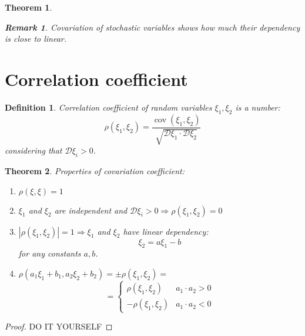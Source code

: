 \documentclass[12pt,letterpaper]{report}
\newtheorem{theorem}{Theorem}[section]
\newtheorem*{remark}{Remark}
\newtheorem{definition}{Definition}
\DeclareMathOperator{\cov}{cov}
\begin{document}
\begin{theorem}
    \begin{remark}
        Covariation of stochastic variables shows how much their dependency is close to linear.
    \end{remark}
\end{theorem}

\section{Correlation coefficient}

\begin{definition}
    Correlation coefficient of random variables $\xi_1, \xi_2$ is a number:
    \[ \rho(\xi_1, \xi_2) = \frac{\cov(\xi_1, \xi_2)}{\sqrt{\mathcal{D}\xi_1 \cdot \mathcal{D}\xi_2}} \]
    considering that $\mathcal{D}\xi_i > 0$.
\end{definition}

\begin{theorem}
    Properties of covariation coefficient:
    \begin{enumerate}
        \item $ \rho(\xi,\xi) = 1 $
        \item $\xi_1$ and $\xi_2$ are independent and $\mathcal{D}\xi_i > 0 \Rightarrow \rho (\xi_1, \xi_2) = 0$ 
        \item $ |\rho(\xi_1, \xi_2)| = 1 \Rightarrow \xi_1$ and $\xi_2$ have linear dependency:
            \[ \xi_2 = a \xi_1 - b \]
            for any constants $a, b$.
        \item $\rho (a_1\xi_1 + b_1, a_2\xi_2 + b_2) = \pm \rho(\xi_1, \xi_2) = $
            \[ = \begin{cases}
                \rho(\xi_1, \xi_2) & a_1 \cdot a_2 > 0 \\
                -\rho(\xi_1, \xi_2) & a_1\cdot a_2 < 0
            \end{cases}\]
    \end{enumerate}
\end{theorem}
\begin{proof}
    DO IT YOURSELF
\end{proof}
\end{document}
